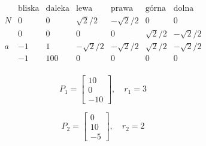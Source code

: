 \[
\begin{array}{c|cccccc}
    & \text{bliska} & \text{daleka} & \text{lewa} & \text{prawa} & \text{górna} & \text{dolna} \\
    \hline
    N & 0 & 0 & \sqrt{2}/2 & -\sqrt{2}/2 & 0 & 0 \\
    & 0 & 0 & 0 & 0 & \sqrt{2}/2 & -\sqrt{2}/2 \\
    a & -1 & 1 & -\sqrt{2}/2 & -\sqrt{2}/2 & \sqrt{2}/2 & -\sqrt{2}/2 \\
    & -1 & 100 & 0 & 0 & 0 & 0 \\
\end{array}
\]

\[
P_1 = \begin{bmatrix} 10 \\ 0 \\ -10 \end{bmatrix}, \quad r_1 = 3
\]

\[
P_2 = \begin{bmatrix} 0 \\ 10 \\ -5 \end{bmatrix}, \quad r_2 = 2
\]


